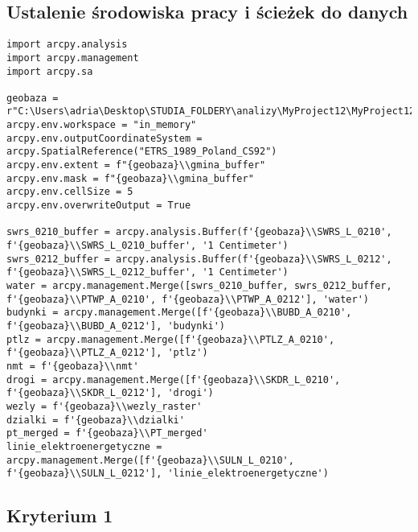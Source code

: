\documentclass{article}
\begin{document}
\subsection{Ustalenie środowiska pracy i ścieżek do danych}
\begin{lstlisting}
import arcpy.analysis
import arcpy.management
import arcpy.sa

geobaza = r"C:\Users\adria\Desktop\STUDIA_FOLDERY\analizy\MyProject12\MyProject12.gdb"
arcpy.env.workspace = "in_memory"
arcpy.env.outputCoordinateSystem = arcpy.SpatialReference("ETRS_1989_Poland_CS92")
arcpy.env.extent = f"{geobaza}\\gmina_buffer"
arcpy.env.mask = f"{geobaza}\\gmina_buffer"
arcpy.env.cellSize = 5
arcpy.env.overwriteOutput = True

swrs_0210_buffer = arcpy.analysis.Buffer(f'{geobaza}\\SWRS_L_0210', f'{geobaza}\\SWRS_L_0210_buffer', '1 Centimeter')
swrs_0212_buffer = arcpy.analysis.Buffer(f'{geobaza}\\SWRS_L_0212', f'{geobaza}\\SWRS_L_0212_buffer', '1 Centimeter')
water = arcpy.management.Merge([swrs_0210_buffer, swrs_0212_buffer, f'{geobaza}\\PTWP_A_0210', f'{geobaza}\\PTWP_A_0212'], 'water')
budynki = arcpy.management.Merge([f'{geobaza}\\BUBD_A_0210', f'{geobaza}\\BUBD_A_0212'], 'budynki')
ptlz = arcpy.management.Merge([f'{geobaza}\\PTLZ_A_0210', f'{geobaza}\\PTLZ_A_0212'], 'ptlz')
nmt = f'{geobaza}\\nmt'
drogi = arcpy.management.Merge([f'{geobaza}\\SKDR_L_0210', f'{geobaza}\\SKDR_L_0212'], 'drogi')
wezly = f'{geobaza}\\wezly_raster'
dzialki = f'{geobaza}\\dzialki'
pt_merged = f'{geobaza}\\PT_merged'
linie_elektroenergetyczne = arcpy.management.Merge([f'{geobaza}\\SULN_L_0210', f'{geobaza}\\SULN_L_0212'], 'linie_elektroenergetyczne')
\end{lstlisting}

\subsection{Kryterium 1}
\end{document}
